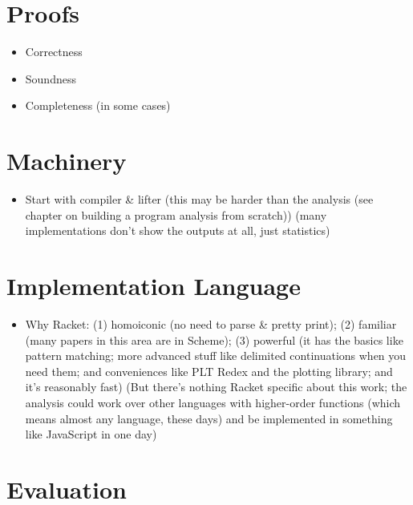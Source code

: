 \documentclass[12pt, oneside]{book}
\begin{document}
\section{Proofs}

\begin{itemize}
  \item Correctness
  \item Soundness
  \item Completeness (in some cases)
\end{itemize}

\section{Machinery}

\begin{itemize}
  \item Start with compiler \& lifter (this may be harder than the analysis (see chapter on building a program analysis from scratch)) (many implementations don’t show the outputs at all, just statistics)
\end{itemize}

\section{Implementation Language}
\label{section:implementation-language}

\begin{itemize}
  \item Why Racket: (1) homoiconic (no need to parse \& pretty print); (2) familiar (many papers in this area are in Scheme); (3) powerful (it has the basics like pattern matching; more advanced stuff like delimited continuations when you need them; and conveniences like PLT Redex and the plotting library; and it’s reasonably fast) (But there’s nothing Racket specific about this work; the analysis could work over other languages with higher-order functions (which means almost any language, these days) and be implemented in something like JavaScript in one day)
\end{itemize}

\section{Evaluation}
\end{document}
